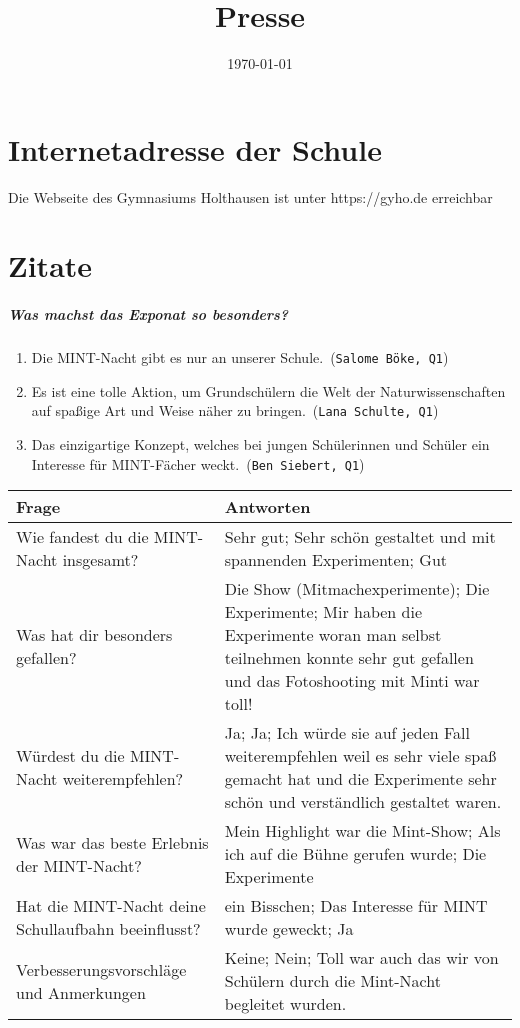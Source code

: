 \documentclass[12pt,a4paper]{report}
\begin{document}
	\bsremovechaptertitle
	\title{Presse}
	\date{\today}
	\maketitle
	\noindent
	\chapter{Internetadresse der Schule}
	Die Webseite des Gymnasiums Holthausen ist unter \color{blue}https://gyho.de \color{black} erreichbar 
	\chapter{Zitate}
	\paragraph{Was machst das Exponat so besonders?} \mbox{}
	\begin{enumerate}
		\item \dq Die MINT-Nacht gibt es nur an unserer Schule.\dq\ (\texttt{Salome Böke, Q1})
		\item \dq Es ist eine tolle Aktion, um Grundschülern die Welt der Naturwissenschaften auf spaßige Art und Weise näher zu bringen.\dq\ (\texttt{Lana Schulte, Q1})
		\item \dq Das einzigartige Konzept, welches bei jungen Schülerinnen und Schüler ein Interesse für MINT-Fächer weckt.\dq\ (\texttt{Ben Siebert, Q1})
	\end{enumerate}
	\begin{tabularx}{\textwidth}{|X|X|}
		\hline
		Frage & Antworten \\
		\hline
		Wie fandest du die MINT-Nacht insgesamt? & Sehr gut;  Sehr schön gestaltet und mit spannenden Experimenten; Gut \\
		\hline
		Was hat dir besonders gefallen? & Die Show (Mitmachexperimente); Die Experimente; Mir haben die Experimente woran man selbst teilnehmen konnte sehr gut gefallen und das Fotoshooting mit Minti war toll! \\
		\hline
		Würdest du die MINT-Nacht weiterempfehlen? & Ja; Ja;  Ich würde sie auf jeden Fall weiterempfehlen weil es sehr viele spaß gemacht hat und die Experimente sehr schön und verständlich gestaltet waren. \\
		\hline
		Was war das beste Erlebnis der MINT-Nacht? & Mein Highlight war die Mint-Show; Als ich auf die Bühne gerufen wurde; Die Experimente \\
		\hline
		Hat die MINT-Nacht deine Schullaufbahn beeinflusst? & ein Bisschen; Das Interesse für MINT wurde geweckt; Ja \\
		\hline
		Verbesserungsvorschläge und Anmerkungen & Keine; Nein; 
Toll war auch das wir von Schülern durch die Mint-Nacht begleitet wurden. \\
		\hline
	\end{tabularx}
	
\end{document}
